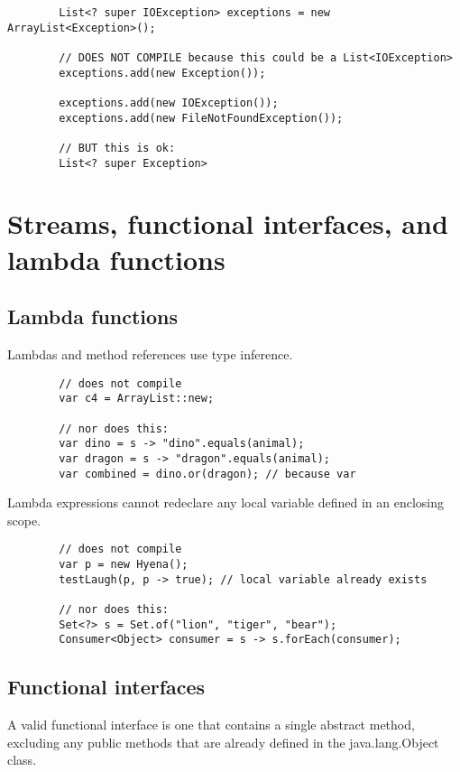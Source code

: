 \documentclass{scrartcl}
\begin{document}
    \begin{lstlisting}
        List<? super IOException> exceptions = new ArrayList<Exception>();

        // DOES NOT COMPILE because this could be a List<IOException>
        exceptions.add(new Exception());

        exceptions.add(new IOException());
        exceptions.add(new FileNotFoundException());

        // BUT this is ok:
        List<? super Exception>
    \end{lstlisting}

\section{Streams, functional interfaces, and lambda functions}
\subsection{Lambda functions}

    Lambdas and method references use type inference.

    \begin{lstlisting}
        // does not compile
        var c4 = ArrayList::new;

        // nor does this:
        var dino = s -> "dino".equals(animal);
        var dragon = s -> "dragon".equals(animal);
        var combined = dino.or(dragon); // because var
    \end{lstlisting}

    Lambda expressions cannot redeclare any local variable defined in an enclosing scope.

    \begin{lstlisting}
        // does not compile
        var p = new Hyena();
        testLaugh(p, p -> true); // local variable already exists

        // nor does this:
        Set<?> s = Set.of("lion", "tiger", "bear");
        Consumer<Object> consumer = s -> s.forEach(consumer);
    \end{lstlisting}




\subsection{Functional interfaces}

    A valid functional interface is one that contains a single abstract method, excluding any public methods that are already defined in the java.lang.Object class.
\end{document}
